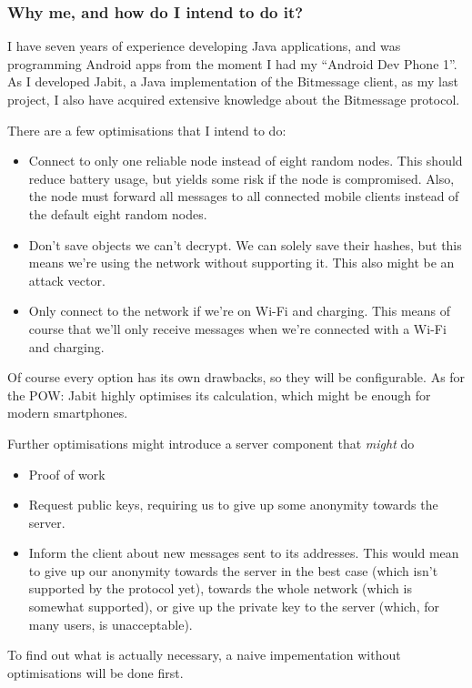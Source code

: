 \documentclass{bfh}
\begin{document}
  \subsubsection{Why me, and how do I intend to do it?}
  I have seven years of experience developing Java applications, and was programming Android apps from the moment I had my ``Android Dev Phone 1''. As I developed Jabit, a Java implementation of the Bitmessage client, as my last project, I also have acquired extensive knowledge about the Bitmessage protocol.

  There are a few optimisations that I intend to do:
  \begin{itemize}
    \item Connect to only one reliable node instead of eight random nodes. This should reduce battery usage, but yields some risk if the node is compromised. Also, the node must forward all messages to all connected mobile clients instead of the default eight random nodes.
    \item Don't save objects we can't decrypt. We can solely save their hashes, but this means we're using the network without supporting it. This also might be an attack vector.
    \item Only connect to the network if we're on Wi-Fi and charging. This means of course that we'll only receive messages when we're connected with a Wi-Fi and charging.
  \end{itemize}
  Of course every option has its own drawbacks, so they will be configurable. As for the \ac{POW}: Jabit highly optimises its calculation, which might be enough for modern smartphones.

  Further optimisations might introduce a server component that \textit{might} do
  \begin{itemize}
    \item Proof of work
    \item Request public keys, requiring us to give up some anonymity towards the server.
    \item Inform the client about new messages sent to its addresses. This would mean to give up our anonymity towards the server in the best case (which isn't supported by the protocol yet), towards the whole network (which is somewhat supported), or give up the private key to the server (which, for many users, is unacceptable).
  \end{itemize}

  To find out what is actually necessary, a naive impementation without optimisations will be done first.
\end{document}
